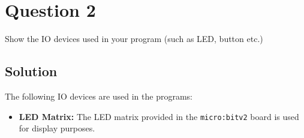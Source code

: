 \section*{Question 2}

Show the IO devices used in your program (such as LED, button etc.)

\subsection*{Solution}

The following IO devices are used in the programs:
\begin{itemize}
    \item \textbf{LED Matrix:} The LED matrix provided in the \texttt{micro:bit\;v2} board is used for display purposes.
\end{itemize}
